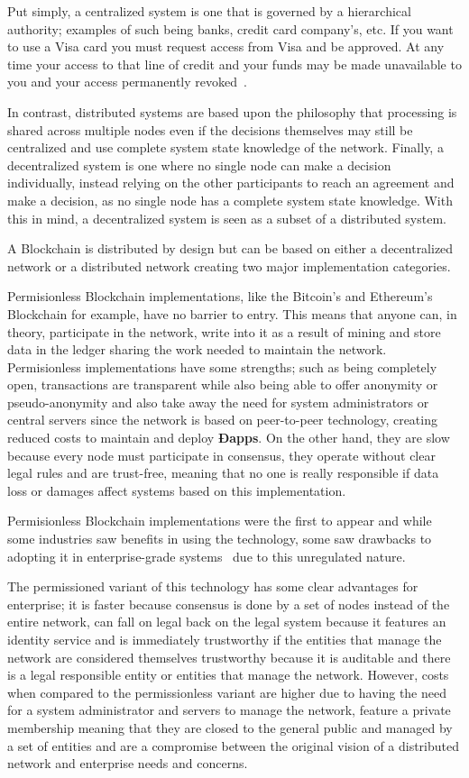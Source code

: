 Put simply, a centralized system is one that is governed by a hierarchical
authority; examples of such being banks, credit card company’s, etc. If you
want to use a Visa card you must request access from Visa and be approved. At
any time your access to that line of credit and your funds may be made
unavailable to you and your access permanently revoked~\cite{Dreifuerst2018}.

In contrast, distributed systems are based upon the philosophy that processing
is shared across multiple nodes even if the decisions themselves may still be
centralized and use complete system state knowledge of the network. Finally, a
decentralized system is one where no single node can make a decision
individually, instead relying on the other participants to reach an agreement
and make a decision, as no single node has a complete system state knowledge.
With this in mind, a decentralized system is seen as a subset of a distributed
system.

A Blockchain is distributed by design but can be based on either a
decentralized network or a distributed network creating two major
implementation categories.

Permisionless Blockchain implementations, like the Bitcoin's and Ethereum's
Blockchain for example, have no barrier to entry. This means that anyone can,
in theory, participate in the network, write into it as a result of mining and
store data in the ledger sharing the work needed to maintain the network.
Permisionless implementations have some strengths; such as being completely
open, transactions are transparent while also being able to offer anonymity or
pseudo-anonymity and also take away the need for system administrators or
central servers since the network is based on peer-to-peer technology, creating
reduced costs to maintain and deploy \textbf{Ðapps}. On the other hand, they
are slow because every node must participate in consensus, they operate without
clear legal rules and are trust-free, meaning that no one is really responsible
if data loss or damages affect systems based on this implementation.

Permisionless Blockchain implementations were the first to appear and while
some industries saw benefits in using the technology, some saw drawbacks to
adopting it in enterprise-grade systems~\cite{Gopinath2016} due to this
unregulated nature.

The permissioned variant of this technology has some clear advantages for
enterprise; it is faster because consensus is done by a set of nodes instead of
the entire network, can fall on legal back on the legal system because it
features an identity service and is immediately trustworthy if the entities
that manage the network are considered themselves trustworthy because it is
auditable and there is a legal responsible entity or entities that manage the
network. However, costs when compared to the permissionless variant are higher
due to having the need for a system administrator and servers to manage the
network, feature a private membership meaning that they are closed to the
general public and managed by a set of entities and are a compromise between
the original vision of a distributed network and enterprise needs and concerns. 

